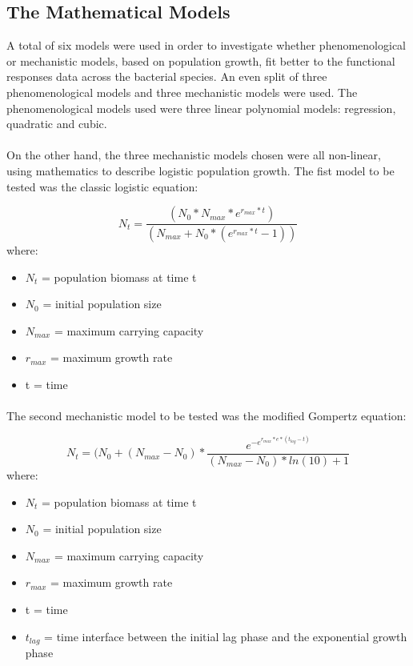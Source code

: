 \documentclass[11pt, a4paper]{article} %
\begin{document}
\subsection{The Mathematical Models}

A total of six models were used in order to investigate whether phenomenological or mechanistic models, based on population growth, fit better to the functional responses data across the bacterial species. An even split of three phenomenological models and three mechanistic models were used. The phenomenological models used were three linear polynomial models: regression, quadratic and cubic.
\paragraph{} On the other hand, the three mechanistic models chosen were all non-linear, using mathematics to describe logistic population growth. The fist model to be tested was the classic logistic equation:

\begin{equation}
N_t = \frac{(N_0 * N_{max} * e^{r_{max} * t})} {(N_{max} + N_0 * (e^{r_{max} * t} - 1))}
\end{equation}
where:
\begin{itemize}
\item $N_t$ = population biomass at time t
\item $N_0$ = initial population size
\item $N_{max}$ = maximum carrying capacity
\item $r_{max}$ = maximum growth rate
\item t = time
\end{itemize}

\paragraph{} The second mechanistic model to be tested was the modified Gompertz equation: 

\begin{equation}
N_t = (N_0 + (N_{max} - N_0) * \frac{e^{-e^{r_{max} * e * (t_{lag} - t)}}} {(N_{max} - N_0) * ln(10) + 1}
\end{equation}
where:
\begin{itemize}
\item $N_t$ = population biomass at time t
\item $N_0$ = initial population size
\item $N_{max}$ = maximum carrying capacity
\item $r_{max}$ = maximum growth rate 
\item t = time
\item $t_{lag}$ = time interface between the initial lag phase and the exponential growth phase
\end{itemize}
\end{document}
